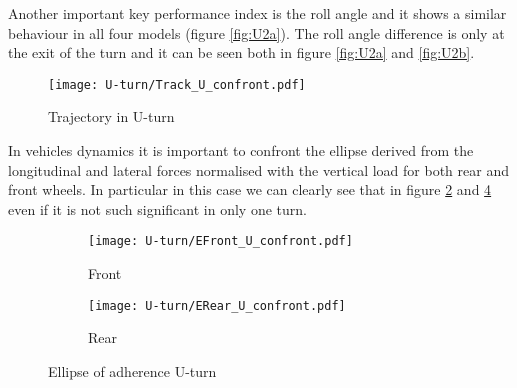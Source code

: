 Another important key performance index is the roll angle and it shows a similar behaviour in all four models (figure \ref{fig:U2a}). The roll angle difference is only at the exit of the turn and it can be seen both in figure \ref{fig:U2a} and \ref{fig:U2b}.\\
%
\begin{figure}[!ht]
    \centering
    \texttt{[image: U-turn/Track\_U\_confront.pdf]}
    \caption{Trajectory in U-turn}
    \label{fig:UTrajectory}
\end{figure}
%
In vehicles dynamics it is important to confront the ellipse derived from the longitudinal and lateral forces normalised with the vertical load for both rear and front wheels. In particular in this case we can clearly see that in figure \ref{fig:UEa} and \ref{fig:UEb} even if it is not such significant in only one turn.\\
%
\begin{figure}[!ht]
    \begin{subfigure}{0.5\linewidth}
        \texttt{[image: U-turn/EFront\_U\_confront.pdf]}
        \caption{Front}
        \label{fig:UEa}
    \end{subfigure}%
    \begin{subfigure}{0.5\linewidth}
        \texttt{[image: U-turn/ERear\_U\_confront.pdf]}
        \caption{Rear}
        \label{fig:UEb}
    \end{subfigure}
    \caption{Ellipse of adherence U-turn}
\end{figure}
%